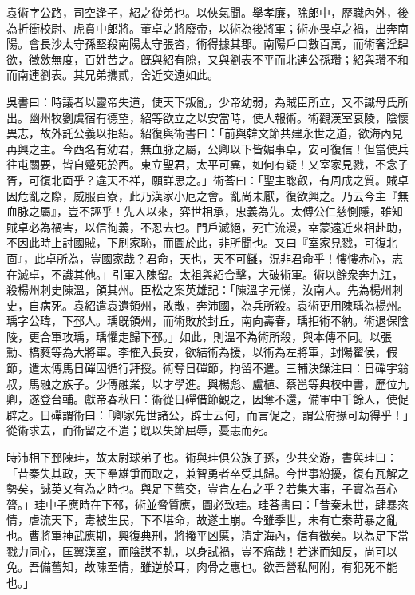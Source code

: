 
\begin{pinyinscope}
袁術字公路，司空逢子，紹之從弟也。以俠氣聞。舉孝廉，除郎中，歷職內外，後為折衝校尉、虎賁中郎將。董卓之將廢帝，以術為後將軍；術亦畏卓之禍，出奔南陽。會長沙太守孫堅殺南陽太守張咨，術得據其郡。南陽戶口數百萬，而術奢淫肆欲，徵斂無度，百姓苦之。旣與紹有隙，又與劉表不平而北連公孫瓚；紹與瓚不和而南連劉表。其兄弟攜貳，舍近交遠如此。

吳書曰：時議者以靈帝失道，使天下叛亂，少帝幼弱，為賊臣所立，又不識母氏所出。幽州牧劉虞宿有德望，紹等欲立之以安當時，使人報術。術觀漢室衰陵，陰懷異志，故外託公義以拒紹。紹復與術書曰：「前與韓文節共建永世之道，欲海內見再興之主。今西名有幼君，無血脉之屬，公卿以下皆媚事卓，安可復信！但當使兵往屯關要，皆自蹙死於西。東立聖君，太平可兾，如何有疑！又室家見戮，不念子胥，可復北靣乎？違天不祥，願詳思之。」術荅曰：「聖主聦叡，有周成之質。賊卓因危亂之際，威服百寮，此乃漢家小厄之會。亂尚未厭，復欲興之。乃云今主『無血脉之屬』，豈不誣乎！先人以來，弈世相承，忠義為先。太傅公仁慈惻隱，雖知賊卓必為禍害，以信徇義，不忍去也。門戶滅絕，死亡流漫，幸蒙遠近來相赴助，不因此時上討國賊，下刷家恥，而圖於此，非所聞也。又曰『室家見戮，可復北靣』，此卓所為，豈國家哉？君命，天也，天不可讎，況非君命乎！慺慺赤心，志在滅卓，不識其他。」引軍入陳留。太祖與紹合擊，大破術軍。術以餘衆奔九江，殺楊州刺史陳溫，領其州。臣松之案英雄記：「陳溫字元悌，汝南人。先為楊州刺史，自病死。袁紹遣袁遺領州，敗散，奔沛國，為兵所殺。袁術更用陳瑀為楊州。瑀字公瑋，下邳人。瑀旣領州，而術敗於封丘，南向壽春，瑀拒術不納。術退保陰陵，更合軍攻瑀，瑀懼走歸下邳。」如此，則溫不為術所殺，與本傳不同。以張勳、橋蕤等為大將軍。李傕入長安，欲結術為援，以術為左將軍，封陽翟侯，假節，遣太傅馬日磾因循行拜授。術奪日磾節，拘留不遣。三輔決錄注曰：日磾字翁叔，馬融之族子。少傳融業，以才學進。與楊彪、盧植、蔡邕等典校中書，歷位九卿，遂登台輔。獻帝春秋曰：術從日磾借節觀之，因奪不還，備軍中千餘人，使促辟之。日磾謂術曰：「卿家先世諸公，辟士云何，而言促之，謂公府掾可劫得乎！」從術求去，而術留之不遣；旣以失節屈辱，憂恚而死。

時沛相下邳陳珪，故太尉球弟子也。術與珪俱公族子孫，少共交游，書與珪曰：「昔秦失其政，天下羣雄爭而取之，兼智勇者卒受其歸。今世事紛擾，復有瓦解之勢矣，誠英乂有為之時也。與足下舊交，豈肯左右之乎？若集大事，子實為吾心膂。」珪中子應時在下邳，術並脅質應，圖必致珪。珪荅書曰：「昔秦末世，肆暴恣情，虐流天下，毒被生民，下不堪命，故遂土崩。今雖季世，未有亡秦苛暴之亂也。曹將軍神武應期，興復典刑，將撥平凶慝，清定海內，信有徵矣。以為足下當戮力同心，匡翼漢室，而陰謀不軌，以身試禍，豈不痛哉！若迷而知反，尚可以免。吾備舊知，故陳至情，雖逆於耳，肉骨之惠也。欲吾營私阿附，有犯死不能也。」


\end{pinyinscope}
